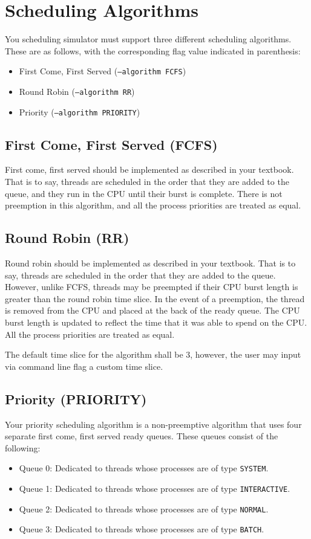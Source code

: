 \documentclass[main.tex]{subfiles}
\begin{document}
\section{Scheduling Algorithms}
\label{sec:algos}

You scheduling simulator must support three different scheduling algorithms. These are as follows, with the corresponding flag value indicated in parenthesis:

\begin{itemize}
    \item First Come, First Served (\texttt{--algorithm FCFS})
    \item Round Robin (\texttt{--algorithm RR})
    \item Priority (\texttt{--algorithm PRIORITY})
\end{itemize}

\subsection{First Come, First Served (FCFS)}
First come, first served should be implemented as described in your textbook. That is to say, threads are scheduled in the order that they are added to the queue, and they run in the CPU until their burst is complete. There is not preemption in this algorithm, and all the process priorities are treated as equal.

\subsection{Round Robin (RR)}
Round robin should be implemented as described in your textbook. That is to say, threads are scheduled in the order that they are added to the queue. However, unlike FCFS, threads may be preempted if their CPU burst length is greater than the round robin time slice. In the event of a preemption, the thread is removed from the CPU and placed at the back of the ready queue. The CPU burst length is updated to reflect the time that it was able to spend on the CPU. All the process priorities are treated as equal.

The default time slice for the algorithm shall be 3, however, the user may input via command line flag a custom time slice.

\subsection{Priority (PRIORITY)}
Your priority scheduling algorithm is a non-preemptive algorithm that uses four separate first come, first served ready queues. These queues consist of the following:
\begin{itemize}
    \item Queue 0: Dedicated to threads whose processes are of type \texttt{SYSTEM}.
    \item Queue 1: Dedicated to threads whose processes are of type \texttt{INTERACTIVE}.
    \item Queue 2: Dedicated to threads whose processes are of type \texttt{NORMAL}.
    \item Queue 3: Dedicated to threads whose processes are of type \texttt{BATCH}.
\end{itemize}
\end{document}

